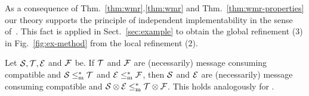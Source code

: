 As a consequence of Thm.~\ref{thm:wmr}.\ref{thm:wmr} and Thm.~\ref{thm:wmr-properties} our theory supports
the principle of independent implementability in the sense of~\cite{alfaroHenzinger2005}.
This fact is applied in Sect.~\ref{sec:example} to obtain the global refinement (3)  in Fig.~\ref{fig:ex-method}
from the local refinement (2).

\begin{corollary}\label{cor:independent}
Let $\S, \T, \E$ and $\F$ be\linebreak \MAIOTSs. If $\T$ and $\F$ are (necessarily) message consuming compatible and
$\S \mrw \T$ and $\E \mrw \F$, then $\S$ and $\E$ are (necessarily) message consuming compatible and
$\S \compos \E \mrw \T \compos \F$. This holds analogously for \MAIOPNs.
\end{corollary}

